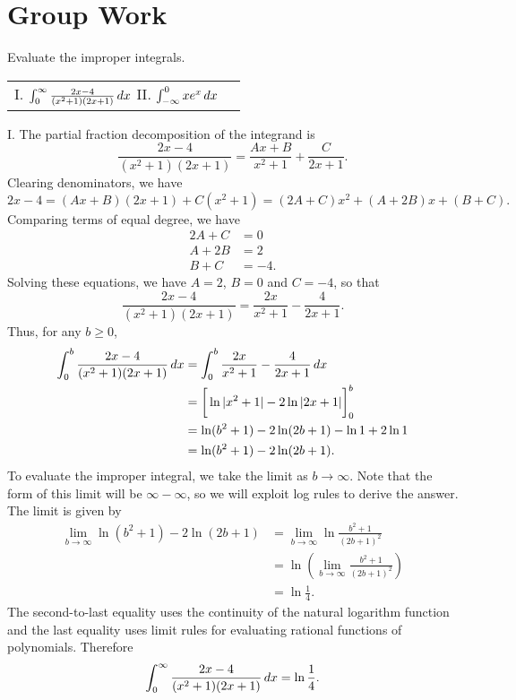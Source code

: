 \documentclass[]{ximera}
\begin{document}
\section{Group Work}

\begin{problem}
Evaluate the improper integrals.
\begin{center}
\begin{tabular}{ll}
I. $\int_0^\infty \frac{2x-4}{(x^2+1)(2x+1)} \mathop{}\!d x$ \hspace{.5in} II. $\int_{-\infty}^0 x e^x \mathop{}\!d x$
\end{tabular}
\end{center}
\end{problem}

\begin{freeResponse}
I. The partial fraction decomposition of the integrand is 
$$
\frac{2x-4}{(x^2+1)(2x+1)} = \frac{Ax+B}{x^2+1} + \frac{C}{2x+1}.
$$
Clearing denominators, we have
$$
2x-4 = (Ax+B)(2x+1) + C(x^2+1) = (2A+C)x^2 + (A+2B)x+(B+C).
$$
Comparing terms of equal degree, we have
\begin{align*}
2A + C &= 0 \\ 
A + 2B &= 2 \\ 
B + C &= -4.
\end{align*}
Solving these equations, we have $A=2$, $B=0$ and $C=-4$, so that 
$$
\frac{2x-4}{(x^2+1)(2x+1)} = \frac{2x}{x^2+1} - \frac{4}{2x+1}.
$$
Thus, for any $b \geq 0$, 
\begin{align*}
\int_0^b \frac{2x-4}{(x^2+1)(2x+1)}  \mathop{}\!d x &= \int_0^b \frac{2x}{x^2+1} - \frac{4}{2x+1} \mathop{}\!d x \\
&= \bigg[ \ln |x^2+1| - 2\ln |2x+1| \bigg]_0^b \\
&= \ln (b^2+1) - 2 \ln (2b+1) - \ln 1 + 2 \ln 1 \\
&= \ln (b^2+1) - 2 \ln (2b+1).
\end{align*}
To evaluate the improper integral, we take the limit as $b\rightarrow \infty$. Note that the form of this limit will be $\infty - \infty$, so we will exploit log rules to derive the answer. The limit is given by
\begin{align*}
\lim_{b\rightarrow \infty} \ln (b^2+1) - 2 \ln (2b+1) &= \lim_{b\rightarrow \infty} \ln \frac{b^2+1}{(2b+1)^2} \\
&= \ln \left(\lim_{b\rightarrow \infty} \frac{b^2+1}{(2b+1)^2}\right) \\
&= \ln \frac{1}{4}.
\end{align*}
The second-to-last equality uses the continuity of the natural logarithm function and the last equality uses limit rules for evaluating rational functions of polynomials. Therefore 
$$
\int_0^\infty \frac{2x-4}{(x^2+1)(2x+1)} \mathop{}\!d x = \ln \frac{1}{4}.
$$


\end{freeResponse}
\end{document}
